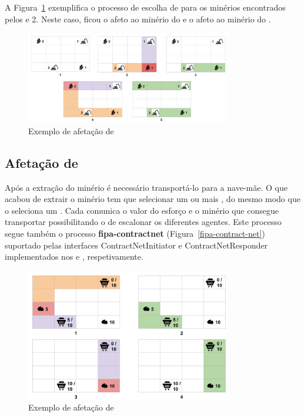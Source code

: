 \documentclass[12pt]{report}
\begin{document}
\FloatBarrier
A Figura~\ref{producer-scheduling} exemplifica o processo de escolha de \producers para os minérios encontrados pelos  e 2. 
Neste caso, ficou o  afeto ao minério do  e o  afeto ao minério do .

\begin{figure}[h]
	\centering
    \includegraphics[width=0.8\textwidth]{producer-scheduling}
	\caption{Exemplo de afetação de \producers}
	\label{producer-scheduling}
\end{figure}

\FloatBarrier
\subsection{Afetação de \transporters}
Após a extração do minério é necessário transportá-lo para a nave-mãe. O \producer que acabou de extrair o minério tem que selecionar um ou mais \transporters, do mesmo modo que o \spotter seleciona um \producer. 
Cada \transporter comunica o valor do esforço e o minério que consegue transportar possibilitando o \producer de escalonar os diferentes agentes.
Este processo segue também o processo \textbf{fipa-contractnet} (Figura~\ref{fipa-contract-net}) suportado pelas interfaces ContractNetInitiator e ContractNetResponder implementados nos \producers e \transporters, respetivamente.

\begin{figure}[h]
	\centering
    \includegraphics[width=0.8\textwidth]{transporter-scheduling}
	\caption{Exemplo de afetação de \transporters}
	\label{transporter-scheduling}
\end{figure}
\end{document}
